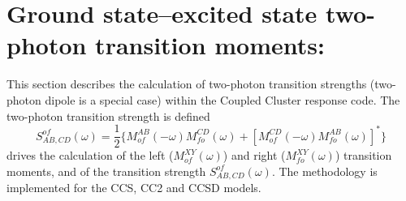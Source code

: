 
\section{Ground state--excited state two-photon transition moments:
} \label{sec:ccsm}

This section describes the calculation of 
two-photon transition strengths 
(two-photon dipole is a special case) 
within the Coupled Cluster response code.
The two-photon transition strength is defined
\[
S^{of}_{AB,CD}(\omega) = \frac{1}{2} \{ M^{AB}_{of}(-\omega) M^{CD}_{fo}(\omega)
                         +[M^{CD}_{of}(-\omega) M^{AB}_{fo}(\omega)]^\ast\}
\]
 drives the calculation of the left ($M^{XY}_{of}(\omega)$)
and right ($M^{XY}_{fo}(\omega)$) transition moments, and of the transition 
strength $S^{of}_{AB,CD}(\omega)$.
The methodology is implemented for the CCS, CC2 and CCSD models.

\begin{center}
\end{center}

